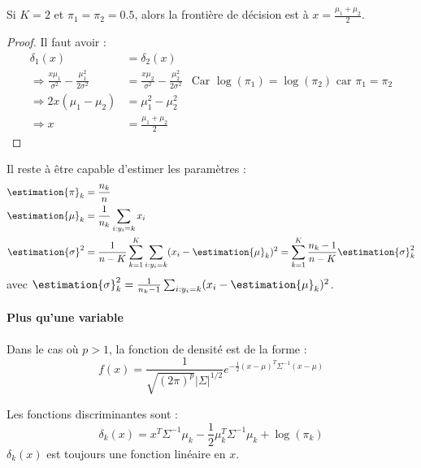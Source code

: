             \begin{theorem}
                Si \(K = 2\) et \(\pi_1 = \pi_2 = 0.5\), alors la frontière de décision est à \(x = \frac{\mu_1 + \mu_2}{2}\).
            \end{theorem}
            \begin{proof}
                Il faut avoir :
                \begin{align*}
                    \delta_1(x) &= \delta_2(x)\\
                    \Rightarrow \frac{x\mu_1}{\sigma^2} - \frac{\mu_1^2}{2\sigma^2} &= \frac{x\mu_2}{\sigma^2} - \frac{\mu_2^2}{2\sigma^2} & \text{Car } \log(\pi_1) = \log(\pi_2) \text{ car } \pi_1 = \pi_2\\
                    \Rightarrow 2x(\mu_1 - \mu_2) &= \mu_1^2 - \mu_2^2\\
                    \Rightarrow x &= \frac{\mu_1 + \mu_2}{2}
                \end{align*}
            \end{proof}

            Il reste à être capable d'estimer les paramètres :
            \begin{align*}
                \estimation{\pi}_k &= \frac{n_k}{n}\\
                \estimation{\mu}_k &= \frac{1}{n_k} \sum_{i:y_i = k} x_i\\
                \estimation{\sigma}^2 &= \frac{1}{n - K} \sum_{k=1}^K \sum_{i:y_i = k} (x_i - \estimation{\mu}_k)^2 = \sum_{k=1}^K \frac{n_k - 1}{n - K} \estimation{\sigma}_k^2
            \end{align*}
            avec \(\estimation{\sigma}_k^2 = \frac{1}{n_k - 1}\sum_{i:y_i = k} (x_i - \estimation{\mu}_k)^2\).

        \paragraph{Plus qu'une variable}
            Dans le cas où \(p > 1\), la fonction de densité est de la forme :
            \[
                f(x) = \frac{1}{\sqrt{(2\pi)^p} |\Sigma|^{1/2}} e^{-\frac{1}{2}(x - \mu)^T \Sigma^{-1}(x-\mu)}
            \]

            Les fonctions discriminantes sont :
            \[
                \delta_k(x) = x^T \Sigma^{-1} \mu_k - \frac{1}{2}\mu_k^T \Sigma^{-1} \mu_k + \log(\pi_k)
            \]
            \(\delta_k(x)\) est toujours une fonction linéaire en \(x\).

